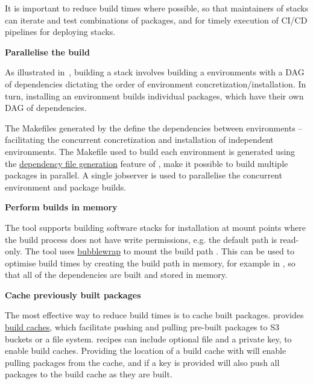 It is important to reduce build times where possible, so that maintainers of stacks can iterate and test combinations of packages, and for timely execution of CI/CD pipelines for deploying stacks.

\noindent\textbf{Parallelise the build}

As illustrated in~, building a \spack stack involves building a \spack environments with a DAG of dependencies dictating the order of environment concretization/installation.
In turn, installing an environment builds individual packages, which have their own DAG of dependencies.

The Makefiles generated by the \stackinator define the dependencies between environments -- facilitating the concurrent concretization and installation of independent environments. The Makefile used to build each environment is generated using the
\href{https://spack.readthedocs.io/en/latest/environments.html#generating-depfiles-from-environments}{dependency file generation} feature of \spack, make it possible to build multiple packages in parallel.
A single jobserver is used to parallelise the concurrent environment and package builds.

\noindent\textbf{Perform builds in memory}

The \stackinator tool supports building software stacks for installation at mount points where the build process does not have write permissions, e.g. the default  path is read-only.
The tool uses \href{https://github.com/containers/bubblewrap}{bubblewrap} to mount the build path .
This can be used to optimise build times by creating the build path in memory, for example in , so that all of the dependencies are built and stored in memory.

\noindent\textbf{Cache previously built packages}

The most effective way to reduce build times is to cache built packages.
\spack provides \href{https://spack.readthedocs.io/en/latest/binary_caches.html}{build caches}, which facilitate pushing and pulling pre-built packages to S3 buckets or a file system.
\stackinator recipes can include optional  file and a private key, to enable build caches.
Providing the location of a build cache with  will enable pulling packages from the cache, and if a key is provided \stackinator will also push all packages to the build cache as they are built.


